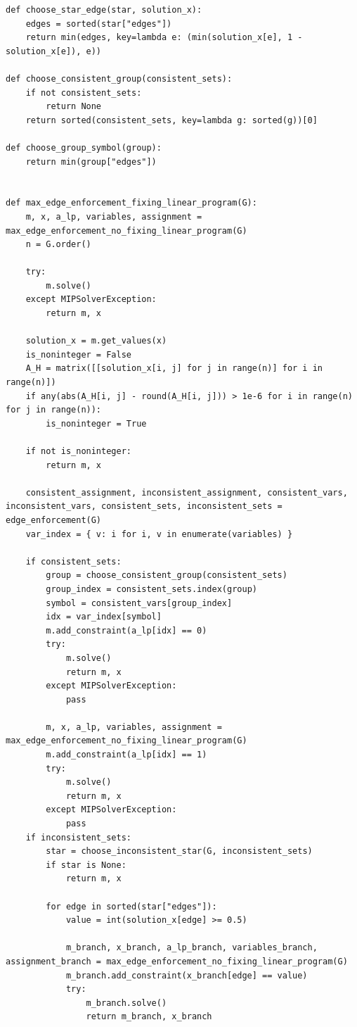 \begin{lstlisting}[style=python, caption={Max Edge Enforcment Linear Program.}, label={lst::max_edge_enforcement_linear_program}]
def choose_star_edge(star, solution_x):
    edges = sorted(star["edges"])
    return min(edges, key=lambda e: (min(solution_x[e], 1 - solution_x[e]), e))

def choose_consistent_group(consistent_sets):
    if not consistent_sets:
        return None
    return sorted(consistent_sets, key=lambda g: sorted(g))[0]

def choose_group_symbol(group):
    return min(group["edges"])


def max_edge_enforcement_fixing_linear_program(G):
    m, x, a_lp, variables, assignment = max_edge_enforcement_no_fixing_linear_program(G)
    n = G.order()

    try:
        m.solve()
    except MIPSolverException:
        return m, x

    solution_x = m.get_values(x)
    is_noninteger = False
    A_H = matrix([[solution_x[i, j] for j in range(n)] for i in range(n)])
    if any(abs(A_H[i, j] - round(A_H[i, j])) > 1e-6 for i in range(n) for j in range(n)):
        is_noninteger = True

    if not is_noninteger:
        return m, x

    consistent_assignment, inconsistent_assignment, consistent_vars, inconsistent_vars, consistent_sets, inconsistent_sets = edge_enforcement(G)
    var_index = { v: i for i, v in enumerate(variables) }

    if consistent_sets:
        group = choose_consistent_group(consistent_sets)
        group_index = consistent_sets.index(group)
        symbol = consistent_vars[group_index]
        idx = var_index[symbol]
        m.add_constraint(a_lp[idx] == 0)
        try:
            m.solve()
            return m, x
        except MIPSolverException:
            pass

        m, x, a_lp, variables, assignment = max_edge_enforcement_no_fixing_linear_program(G)
        m.add_constraint(a_lp[idx] == 1)
        try:
            m.solve()
            return m, x
        except MIPSolverException:
            pass
    if inconsistent_sets:
        star = choose_inconsistent_star(G, inconsistent_sets)
        if star is None:
            return m, x

        for edge in sorted(star["edges"]):
            value = int(solution_x[edge] >= 0.5)

            m_branch, x_branch, a_lp_branch, variables_branch, assignment_branch = max_edge_enforcement_no_fixing_linear_program(G)
            m_branch.add_constraint(x_branch[edge] == value)
            try:
                m_branch.solve()
                return m_branch, x_branch


\end{lstlisting}
